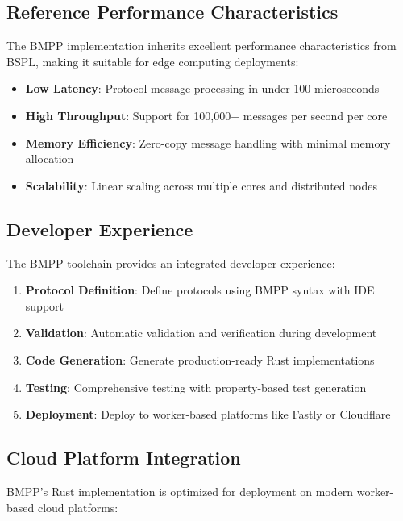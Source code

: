 \documentclass[11pt,a4paper]{article}
\begin{document}
	\subsection{Reference Performance Characteristics}
	\label{subsec:performance}
	
	The BMPP implementation inherits excellent performance characteristics from BSPL, making it suitable for edge computing deployments:
	
	\begin{itemize}
		\item \textbf{Low Latency}: Protocol message processing in under 100 microseconds
		\item \textbf{High Throughput}: Support for 100,000+ messages per second per core
		\item \textbf{Memory Efficiency}: Zero-copy message handling with minimal memory allocation
		\item \textbf{Scalability}: Linear scaling across multiple cores and distributed nodes
	\end{itemize}
	
	\subsection{Developer Experience}
	\label{subsec:devexp}
	
	The BMPP toolchain provides an integrated developer experience:
	
	\begin{enumerate}
		\item \textbf{Protocol Definition}: Define protocols using BMPP syntax with IDE support
		\item \textbf{Validation}: Automatic validation and verification during development
		\item \textbf{Code Generation}: Generate production-ready Rust implementations
		\item \textbf{Testing}: Comprehensive testing with property-based test generation
		\item \textbf{Deployment}: Deploy to worker-based platforms like Fastly or Cloudflare
	\end{enumerate}
	
	\subsection{Cloud Platform Integration}
	\label{subsec:cloud}
	
	BMPP's Rust implementation is optimized for deployment on modern worker-based cloud platforms:
	
\end{document}
